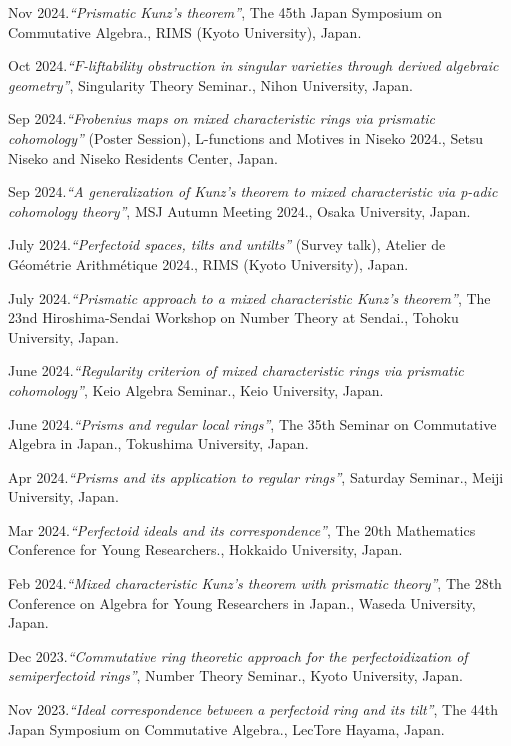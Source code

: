 \documentclass[10pt,a4paper,sans]{moderncv}
\begin{document}
\begin{etaremune}
  \item Nov 2024.\emph{``Prismatic Kunz's theorem''}, \textsf{The 45th Japan Symposium on Commutative Algebra.}, RIMS (Kyoto University), Japan.
  \item Oct 2024.\emph{``\(F\)-liftability obstruction in singular varieties through derived algebraic geometry''}, \textsf{Singularity Theory Seminar.}, Nihon University, Japan.
  \item Sep 2024.\emph{``Frobenius maps on mixed characteristic rings via prismatic cohomology''} (Poster Session), \textsf{L-functions and Motives in Niseko 2024.}, Setsu Niseko and Niseko Residents Center, Japan.
  \item Sep 2024.\emph{``A generalization of Kunz's theorem to mixed characteristic via p-adic cohomology theory''}, \textsf{MSJ Autumn Meeting 2024.}, Osaka University, Japan.
  \item July 2024.\emph{``Perfectoid spaces, tilts and untilts''} (Survey talk), \textsf{Atelier de Géométrie Arithmétique 2024.}, RIMS (Kyoto University), Japan.
  \item July 2024.\emph{``Prismatic approach to a mixed characteristic Kunz's theorem''}, \textsf{The 23nd Hiroshima-Sendai Workshop on Number Theory at Sendai.}, Tohoku University, Japan.
  \item June 2024.\emph{``Regularity criterion of mixed characteristic rings via prismatic cohomology''}, \textsf{Keio Algebra Seminar.}, Keio University, Japan.
  \item June 2024.\emph{``Prisms and regular local rings''}, \textsf{The 35th Seminar on Commutative Algebra in Japan.}, Tokushima University, Japan.
  \item Apr 2024.\emph{``Prisms and its application to regular rings''}, \textsf{Saturday Seminar.}, Meiji University, Japan.
  \item Mar 2024.\emph{``Perfectoid ideals and its correspondence''}, \textsf{The 20th Mathematics Conference for Young Researchers.}, Hokkaido University, Japan.
  \item Feb 2024.\emph{``Mixed characteristic Kunz's theorem with prismatic theory''}, \textsf{The 28th Conference on Algebra for Young Researchers in Japan.}, Waseda University, Japan.
  \item Dec 2023.\emph{``Commutative ring theoretic approach for the perfectoidization of semiperfectoid rings''}, \textsf{Number Theory Seminar.}, Kyoto University, Japan.
  \item Nov 2023.\emph{``Ideal correspondence between a perfectoid ring and its tilt''}, \textsf{The 44th Japan Symposium on Commutative Algebra.}, LecTore Hayama, Japan.

\end{etaremune}
\end{document}
